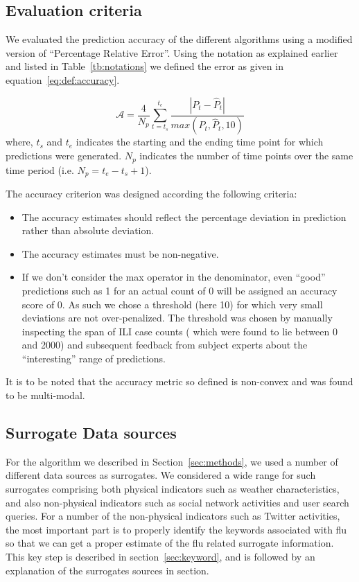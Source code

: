 \subsection{Evaluation criteria}
We evaluated the prediction accuracy of the different algorithms using
a modified version of ``Percentage Relative Error''. Using the notation
as explained earlier and listed in Table~\ref{tb:notations} we defined
the error as given in equation~\ref{eq:def:accuracy}.

\begin{equation}
  \label{eq:def:accuracy}
  \mathcal{A} = \frac{4}{N_p}\sum \limits_{t=t_s}^{t_e}\frac{|P_t -\hat{P}_t| }{max(P_t, \hat{P}_t, 10)}
\end{equation}
where, $t_s$ and $t_e$ indicates the starting and the ending time point for which predictions were generated.
$N_p$ indicates the number of time points over the same time period (i.e. $N_p = t_e - t_s + 1$). 

The accuracy criterion was designed according the following criteria:
\begin{itemize}
  \item The accuracy estimates should reflect the percentage deviation in prediction rather than
    absolute deviation. 
  \item The accuracy estimates must be non-negative.
  \item 
    If we don't consider the max operator in the denominator, even ``good'' 
    predictions such as 1 for an actual count of 0 will be assigned an accuracy 
    score of 0. As such we chose a threshold (here 10) for which very small deviations
    are not over-penalized. The threshold was chosen by manually inspecting the 
    span of ILI case counts ( which were found to lie between 0 and 
    2000) and subsequent feedback from subject experts about the ``interesting'' 
    range of predictions.
\end{itemize}
It is to be noted that the accuracy metric so defined is non-convex and was found to be 
multi-modal. 


\subsection{Surrogate Data sources}
For the algorithm we described in Section~\ref{sec:methods}, we used a number of 
different data sources as surrogates. We considered a wide range for such surrogates 
comprising both physical indicators such as weather characteristics, and also 
non-physical indicators such as social network activities and user search queries.
For a number of the non-physical indicators such as Twitter activities,
the most important part is to properly identify the keywords
associated with flu so that we can get a proper estimate of the flu
related surrogate information. This key step is described in section~\ref{sec:keyword},
and is followed by an explanation of the surrogates sources in section. 

